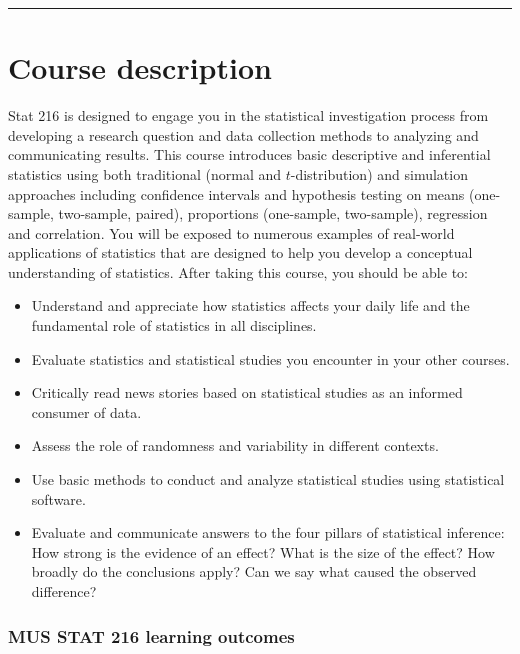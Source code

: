 \documentclass[
]{article}
\providecommand{\tightlist}{%
  \setlength{\itemsep}{0pt}\setlength{\parskip}{0pt}}
\begin{document}
\begin{center}\rule{0.5\linewidth}{0.5pt}\end{center}

\section{Course description}\label{course-description}

Stat 216 is designed to engage you in the statistical investigation
process from developing a research question and data collection methods
to analyzing and communicating results. This course introduces basic
descriptive and inferential statistics using both traditional (normal
and \(t\)-distribution) and simulation approaches including confidence
intervals and hypothesis testing on means (one-sample, two-sample,
paired), proportions (one-sample, two-sample), regression and
correlation. You will be exposed to numerous examples of real-world
applications of statistics that are designed to help you develop a
conceptual understanding of statistics. After taking this course, you
should be able to:

\begin{itemize}
\tightlist
\item
  Understand and appreciate how statistics affects your daily life and
  the fundamental role of statistics in all disciplines.
\item
  Evaluate statistics and statistical studies you encounter in your
  other courses.
\item
  Critically read news stories based on statistical studies as an
  informed consumer of data.
\item
  Assess the role of randomness and variability in different contexts.
\item
  Use basic methods to conduct and analyze statistical studies using
  statistical software.
\item
  Evaluate and communicate answers to the four pillars of statistical
  inference: How strong is the evidence of an effect? What is the size
  of the effect? How broadly do the conclusions apply? Can we say what
  caused the observed difference?
\end{itemize}

\subsubsection{MUS STAT 216 learning
outcomes}\label{mus-stat-216-learning-outcomes}
\end{document}
